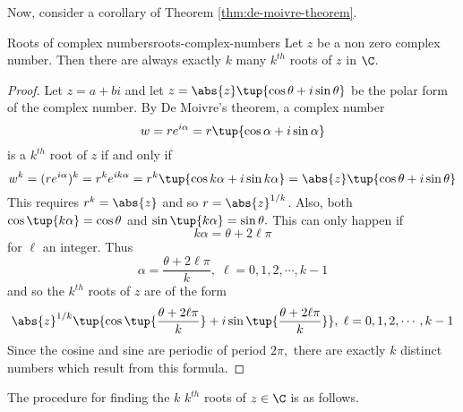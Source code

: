 Now, consider a corollary of Theorem \ref{thm:de-moivre-theorem}.

\begin{corollary}{Roots of complex numbers}{roots-complex-numbers}
Let $z$ be a non zero complex number.
Then there are always exactly $k$ many  $k^{th}$
roots of $z$ in $\C$.
\end{corollary}

\begin{proof}
Let $z=a+bi$ and let $z=\abs{z}\tup{\cos
\theta+i\sin \theta} $ be the polar form of the complex number. By De Moivre's
theorem, a complex number
\begin{equation*}
w= r e^{i \alpha} = r\tup{\cos \alpha +i\sin \alpha } 
\end{equation*}
is a $k^{th}$ root of $z$ if and only if
\begin{equation*}
w^k = (r e^{i \alpha})^k = r^k e^{ik\alpha} = r^{k}\tup{\cos k\alpha +i\sin k\alpha } =\abs{z}\tup{\cos \theta+i\sin \theta} 
\end{equation*}
This requires $r^{k}=\abs{z}$ and so $r=\abs{z}^{1/k}$. Also, both $\cos \tup{k\alpha } =\cos \theta$ and
$\sin \tup{k\alpha } =\sin \theta.$ This can only happen if
\begin{equation*}
k\alpha =\theta+2 \ell \pi
\end{equation*}
for $\ell$ an integer. Thus
\begin{equation*}
\alpha =
\frac{\theta+2 \ell \pi }{k},\; \ell = 0, 1, 2, \cdots, k-1 
\end{equation*}
and so the $k^{th}$ roots of $z$ are of the form
\begin{equation*}
\abs{z}^{1/k}\tup{\cos \tup{\frac{\theta+2 \ell \pi }{k}}
+i\sin \tup{\frac{\theta+2 \ell \pi }{k}} } ,\;\ell = 0, 1, 2, \cdots, k-1 
\end{equation*}
Since the cosine and sine are periodic of period $2\pi ,$ there are exactly $
k$ distinct numbers which result from this formula. 
\end{proof}

The procedure for finding the $k$ $k^{th}$ roots of $z \in \C$ is as follows.

